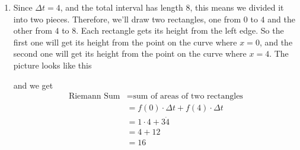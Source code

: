 \documentclass[oneside]{book}
\theoremstyle{definition}
\theoremstyle{solution}
\newtheorem*{solution}{Solution}
\newenvironment{solution}{\vspace{2in}\comment}{\endcomment}
\begin{document}
\begin{solution}
\begin{enumerate}
\item Since $\Delta t = 4$, and the total interval has length $8$,
  this means we divided it into two pieces.  Therefore, we'll draw two
  rectangles, one from $0$ to $4$ and the other from $4$ to $8$.  Each
  rectangle gets its height from the left edge.  So the first one will
  get its height from the point on the curve where $x=0$, and the
  second one will get its height from the point on the curve where
  $x=4$.  The picture looks like this
\begin{center}
\end{center}
and we get 
\begin{align*}
\text{Riemann Sum} & = \text{sum of areas of two rectangles}\\
  & = f(0)\cdot \Delta t + f(4)\cdot \Delta t\\
  & = 1\cdot 4 + 3 \dot 4 \\
  & = 4+12 \\
  & = 16
\end{align*}


\end{enumerate}
\end{solution}
\end{document}
